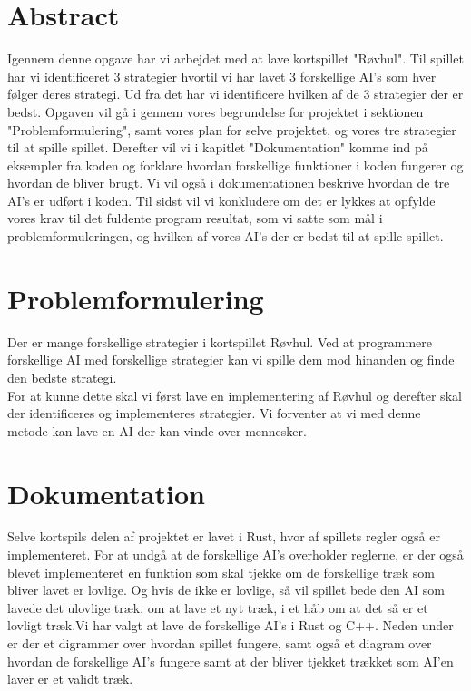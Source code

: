 \documentclass[a4paper, 12pt]{article}
\begin{document}
\section{Abstract}

Igennem denne opgave har vi arbejdet med at lave kortspillet "Røvhul". Til spillet har vi identificeret 3 strategier hvortil vi har lavet 3 forskellige AI’s som hver følger deres strategi. Ud fra det har vi identificere hvilken af de 3 strategier der er bedst. Opgaven vil gå i gennem vores begrundelse for projektet i sektionen "Problemformulering", samt vores plan for selve projektet, og vores tre strategier til at spille spillet.
\bigbreak
Derefter vil vi i kapitlet "Dokumentation" komme ind på eksempler fra koden og forklare hvordan forskellige funktioner i koden fungerer og hvordan de bliver brugt. Vi vil også i dokumentationen beskrive hvordan de tre AI's er udført i koden. 
\bigbreak
Til sidst vil vi konkludere om det er lykkes at opfylde vores krav til det fuldente program resultat, som vi satte som mål i problemformuleringen, og hvilken af vores AI's der er bedst til at spille spillet.

\section{Problemformulering}

Der er mange forskellige strategier i kortspillet Røvhul. Ved at programmere forskellige AI med forskellige strategier kan vi spille dem mod hinanden og finde den bedste strategi.
\\
For at kunne dette skal vi først lave en implementering af Røvhul og derefter skal der identificeres og implementeres strategier. Vi forventer at vi med denne metode kan lave en AI der kan vinde over mennesker.

\vfill
\pagebreak

\section{Dokumentation}
Selve kortspils delen af projektet er lavet i Rust, hvor af spillets regler også er implementeret. For at undgå at de forskellige AI's overholder reglerne, er der også blevet implementeret en funktion som skal tjekke om de forskellige træk som bliver lavet er lovlige. Og hvis de ikke er lovlige, så vil spillet bede den AI som lavede det ulovlige træk, om at lave et nyt træk, i et håb om at det så er et lovligt træk.Vi har valgt at lave de forskellige AI's i Rust og C++. Neden under er der et digrammer over hvordan spillet fungere, samt også et diagram over hvordan de forskellige AI's fungere samt at der bliver tjekket trækket som AI'en laver er et validt træk.
\end{document}
